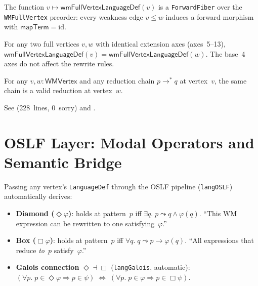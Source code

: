 \documentclass[11pt,openany]{report}
\begin{document}
\begin{theorem}
The function $v \mapsto \mathsf{wmFullVertexLanguageDef}(v)$ is a
\texttt{ForwardFiber} over the \texttt{WMFullVertex} preorder:
every weakness edge $v \le w$ induces a forward morphism with
$\mathsf{mapTerm} = \mathrm{id}$.
\end{theorem}

\begin{theorem}
For any two full vertices $v, w$ with identical extension axes (axes~5--13),
$\mathsf{wmFullVertexLanguageDef}(v) = \mathsf{wmFullVertexLanguageDef}(w)$.
The base~4 axes do not affect the rewrite rules.
\end{theorem}

\begin{theorem}
For any $v, w : \mathsf{WMVertex}$ and any reduction chain
$p \to^* q$ at vertex~$v$, the same chain is a valid reduction at
vertex~$w$.
\end{theorem}

\noindent
See 
(228~lines, 0~sorry) and
.

\section{OSLF Layer: Modal Operators and Semantic Bridge}
\label{sec:wm-oslf-layer}
\label{sec:wm-oslf}
\label{sec:wm-gslt-bridge}

Passing any vertex's \texttt{LanguageDef} through the OSLF pipeline
(\texttt{langOSLF}) automatically derives:

\begin{itemize}
\item \textbf{Diamond ($\Diamond\varphi$)}: holds at pattern~$p$ iff
  $\exists q.\; p \leadsto q \wedge \varphi(q)$.
  ``This WM expression can be rewritten to one satisfying~$\varphi$.''

\item \textbf{Box ($\Box\varphi$)}: holds at pattern~$p$ iff
  $\forall q.\; q \leadsto p \to \varphi(q)$.
  ``All expressions that reduce \emph{to}~$p$ satisfy~$\varphi$.''

\item \textbf{Galois connection} $\Diamond \dashv \Box$
  (\texttt{langGalois}, automatic):
  $(\forall p.\; p \in \Diamond\varphi \Rightarrow p \in \psi)
  \;\Leftrightarrow\;
  (\forall p.\; p \in \varphi \Rightarrow p \in \Box\psi)$.
\end{itemize}
\end{document}
